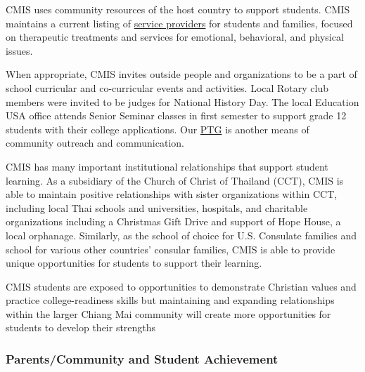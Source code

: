 

\begin{findings}
CMIS uses community resources of the host country to support students. CMIS maintains a current listing of \href{https://drive.google.com/drive/u/0/folders/0B_rFN7xA3AUNTC0yaWxCMEVYTkE}{service providers} for students and families, focused on therapeutic treatments and services for emotional, behavioral, and physical issues.

When appropriate, CMIS invites outside people and organizations to be a part of school curricular and co-curricular events and activities.  Local Rotary club members were invited to be judges for National History Day.  The local Education USA office attends Senior Seminar classes in first semester to support grade 12 students with their college applications. Our \href{http://blogs.cmis.ac.th/ptg/}{PTG} is another means of community outreach and communication. 

CMIS has many important institutional relationships that support student learning.  As a subsidiary of the Church of Christ of Thailand (CCT), CMIS is able to maintain positive relationships with sister organizations within CCT, including local Thai schools and universities, hospitals, and charitable organizations including a Christmas Gift Drive and support of Hope House, a local orphanage.  Similarly, as the school of choice for U.S. Consulate families and school for various other countries’ consular families, CMIS is able to provide unique opportunities for students to support their learning.


CMIS students are exposed to opportunities to demonstrate Christian values and practice college-readiness skills but maintaining and expanding relationships within the larger Chiang Mai community will create more opportunities for students to develop their strengths
\end{findings}

\subsubsection{Parents/Community and Student Achievement}


